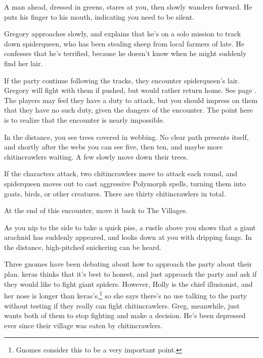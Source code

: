 \begin{multicols}{2}
\begin{boxtext}

	A man ahead, dressed in greens, stares at you, then slowly wanders forward.  He puts his finger to his mouth, indicating you need to be silent.

\end{boxtext}

Gregory approaches slowly, and explains that he's on a solo mission to track down \gls{spiderqueen}, who has been stealing sheep from local farmers of late.  He confesses that he's terrified, because he doesn't know when he might suddenly find her lair.

If the party continue following the tracks, they encounter \gls{spiderqueen}'s lair.  Gregory will fight with them if pushed, but would rather return home.  See page \pageref{spiderqueen}.  The players may feel they have a duty to attack, but you should impress on them that they have no such duty, given the dangers of the encounter.  The point here is to realize that the encounter is nearly impossible.

\begin{boxtext}
	In the distance, you see trees covered in webbing.  No clear path presents itself, and shortly after the webs you can see five, then ten, and maybe more chitincrawlers waiting.  A few slowly move down their trees.
\end{boxtext}

If the characters attack, two chitincrawlers move to attack each round, and \gls{spiderqueen} moves out to cast aggressive Polymorph spells, turning them into goats, birds, or other creatures.
There are thirty chitincrawlers in total.

At the end of this encounter, move it back to The Villages.



\begin{boxtext}

	As you nip to the side to take a quick piss, a rustle above you shows that a giant arachnid has suddenly appeared, and looks down at you with dripping fangs.  In the distance, high-pitched snickering can be heard.

\end{boxtext}

Three gnomes have been debating about how to approach the party about their plan.
\Gls{keras} thinks that it's best to honest, and just approach the party and ask if they would like to fight giant spiders.
However, Holly is the chief illusionist, and her nose is longer than \gls{keras}'s,\footnote{Gnomes consider this to be a very important point.} so she says there's no use talking to the party without testing if they really can fight chitincrawlers.
Greg, meanwhile, just wants both of them to stop fighting and make a decision.
He's been depressed ever since their village was eaten by chitincrawlers.


\end{multicols}
